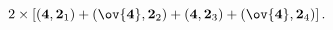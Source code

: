 \begin{equation}
2  \times \left[ ({\bf 4},{\bf 2}_1)+(\ov{\bf 4},{\bf 2}_2)
+({\bf 4},{\bf 2}_3)+(\ov{\bf 4},{\bf 2}_4)
\right].
\label{EqPS4chiralspectrum}
\end{equation}

